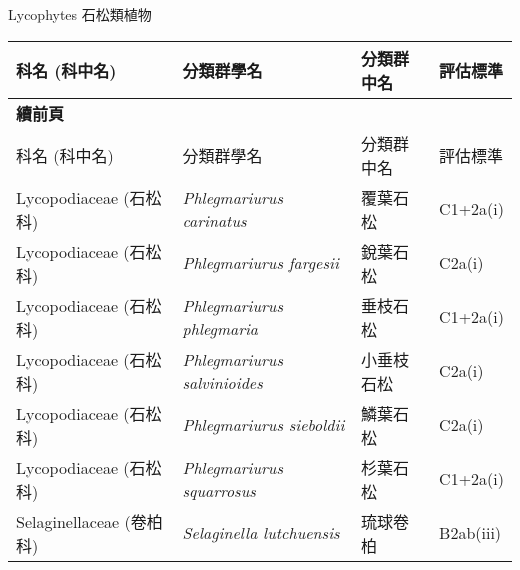 \noindent\normalfont\selectfont Lycophytes 石松類植物
\footnotesize\selectfont
        \begin{longtable}{p{3cm}p{5cm}p{3cm}p{4cm}}
        \toprule
          科名 (科中名) & 分類群學名 & 分類群中名 & 評估標準 \\
        \midrule 
        \endfirsthead

        {{\bfseries 續前頁 }} \\
        科名 (科中名) & 分類群學名 & 分類群中名 & 評估標準 \\
        \midrule
        \endhead
                Lycopodiaceae (石松科) & \textit{Phlegmariurus carinatus}  & 覆葉石松 & C1+2a(i) \index{Phlegmariurus@\textit{Phlegmariurus}!carinatus@\textit{carinatus}}  \index{覆葉石松} \\
    Lycopodiaceae (石松科) & \textit{Phlegmariurus fargesii}  & 銳葉石松 & C2a(i) \index{Phlegmariurus@\textit{Phlegmariurus}!fargesii@\textit{fargesii}}  \index{銳葉石松} \\
    Lycopodiaceae (石松科) & \textit{Phlegmariurus phlegmaria}  & 垂枝石松 & C1+2a(i) \index{Phlegmariurus@\textit{Phlegmariurus}!phlegmaria@\textit{phlegmaria}}  \index{垂枝石松} \\
    Lycopodiaceae (石松科) & \textit{Phlegmariurus salvinioides}  & 小垂枝石松 & C2a(i) \index{Phlegmariurus@\textit{Phlegmariurus}!salvinioides@\textit{salvinioides}}  \index{小垂枝石松} \\
    Lycopodiaceae (石松科) & \textit{Phlegmariurus sieboldii}  & 鱗葉石松 & C2a(i) \index{Phlegmariurus@\textit{Phlegmariurus}!sieboldii@\textit{sieboldii}}  \index{鱗葉石松} \\
    Lycopodiaceae (石松科) & \textit{Phlegmariurus squarrosus}  & 杉葉石松 & C1+2a(i) \index{Phlegmariurus@\textit{Phlegmariurus}!squarrosus@\textit{squarrosus}}  \index{杉葉石松} \\
    Selaginellaceae (卷柏科) & \textit{Selaginella lutchuensis}  & 琉球卷柏 & B2ab(iii) \index{Selaginella@\textit{Selaginella}!lutchuensis@\textit{lutchuensis}}  \index{琉球卷柏} \\
    \bottomrule
        \end{longtable}
